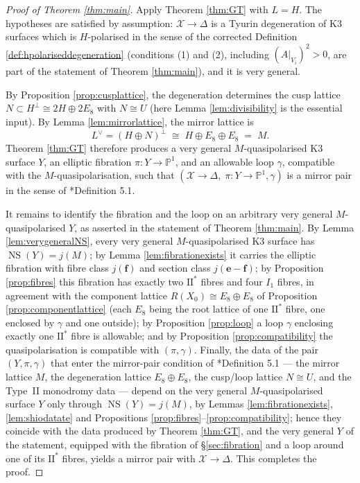 \documentclass[11pt]{amsart}
\theoremstyle{plain}
\theoremstyle{definition}
\newcommand{\Pn}{\mathbb{P}^1}
\newcommand{\NS}{\operatorname{NS}}
\newcommand{\cX}{\mathcal{X}}
\newcommand{\e}{\mathbf{e}}
\newcommand{\ff}{\mathbf{f}}
\begin{document}
\begin{proof}[Proof of Theorem \ref{thm:main}]
Apply Theorem \ref{thm:GT} with $L=H$. The hypotheses are satisfied by
assumption: $\cX\to\Delta$ is a Tyurin degeneration of K3 surfaces which is
$H$-polarised in the sense of the corrected Definition
\ref{def:hpolariseddegeneration} (conditions (1) and (2), including
$(A|_{V_i})^2>0$, are part of the statement of Theorem \ref{thm:main}), and it
is very general.

By Proposition \ref{prop:cusplattice}, the degeneration determines the cusp
lattice $N\subset H^\perp\cong 2H\oplus 2E_8$ with $N\cong U$ (here Lemma
\ref{lem:divisibility} is the essential input). By Lemma
\ref{lem:mirrorlattice}, the mirror lattice is
\[
L^\vee=(H\oplus N)^\perp\;\cong\;H\oplus E_8\oplus E_8\;=\;M.
\]
Theorem \ref{thm:GT} therefore produces a very general
$M$-quasipolarised K3 surface $Y$, an elliptic fibration
$\pi\colon Y\to\Pn$, and an allowable loop $\gamma$, compatible with the
$M$-quasipolarisation, such that $(\cX\to\Delta,\;\pi\colon Y\to\Pn,\gamma)$ is
a mirror pair in the sense of \cite{dfk3slpms}*{Definition 5.1}.

It remains to identify the fibration and the loop on an arbitrary very general
$M$-quasipolarised $Y$, as asserted in the statement of Theorem
\ref{thm:main}. By Lemma \ref{lem:verygeneralNS}, every very general
$M$-quasipolarised K3 surface has $\NS(Y)=j(M)$; by Lemma
\ref{lem:fibrationexists} it carries the elliptic fibration with fibre class
$j(\ff)$ and section class $j(\e-\ff)$; by Proposition \ref{prop:fibres} this
fibration has exactly two $\mathrm{II}^*$ fibres and four $I_1$ fibres, in
agreement with the component lattice $R(X_0)\cong E_8\oplus E_8$ of
Proposition \ref{prop:componentlattice} (each $E_8$ being the root lattice of
one $\mathrm{II}^*$ fibre, one enclosed by $\gamma$ and one outside); by
Proposition \ref{prop:loop} a loop $\gamma$ enclosing exactly one
$\mathrm{II}^*$ fibre is allowable; and by Proposition \ref{prop:compatibility}
the quasipolarisation is compatible with $(\pi,\gamma)$. Finally, the data of
the pair $(Y,\pi,\gamma)$ that enter the mirror-pair condition of
\cite{dfk3slpms}*{Definition 5.1} --- the mirror lattice $M$, the
degeneration lattice $E_8\oplus E_8$, the cusp/loop lattice $N\cong U$, and the
Type~II monodromy data --- depend on the very general $M$-quasipolarised
surface $Y$ only through $\NS(Y)=j(M)$, by
Lemmas \ref{lem:fibrationexists}, \ref{lem:shiodatate} and Propositions
\ref{prop:fibres}--\ref{prop:compatibility}; hence they coincide with the data
produced by Theorem \ref{thm:GT}, and the very general $Y$ of the statement,
equipped with the fibration of \S\ref{sec:fibration} and a loop around one of
its $\mathrm{II}^*$ fibres, yields a mirror pair with $\cX\to\Delta$. This
completes the proof.
\end{proof}
\end{document}
